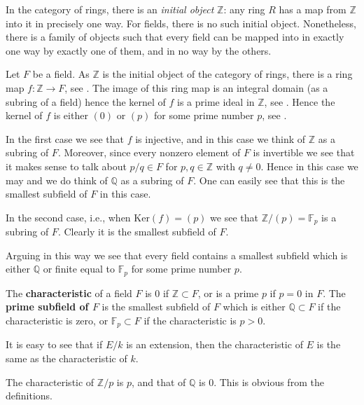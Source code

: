 In the category of rings, there is an \emph{initial object} $\mathbb{Z}$: any
ring $R$ has a map from $\mathbb{Z}$ into it in precisely one way. For fields,
there is no such initial object.
Nonetheless, there is a family of objects such that every field can be mapped
into in exactly one way by exactly one of them, and in no way by the others.

Let $F$ be a field. As $\mathbb{Z}$ is the initial object of the category of
rings, there is a ring map $f : \mathbb{Z} \to F$, see
.
The image of this ring map is an integral domain (as a subring of a field)
hence the kernel of $f$ is a prime ideal in $\mathbb{Z}$, see
.
Hence the kernel of $f$ is either $(0)$ or $(p)$ for some prime number $p$, see
.

In the first case we see that $f$ is injective, and in this case
we think of $\mathbb{Z}$ as a subring of $F$. Moreover, since every
nonzero element of $F$ is invertible we see that it makes sense to
talk about $p/q \in F$ for $p, q \in \mathbb{Z}$ with $q \not = 0$.
Hence in this case we may and we do think of $\mathbb{Q}$ as a subring of $F$.
One can easily see that this is the smallest subfield of $F$ in this case.

In the second case, i.e., when $\text{Ker}(f) = (p)$ we see that
$\mathbb{Z}/(p) = \mathbb{F}_p$ is a subring of $F$.  Clearly it is the smallest subfield of $F$.

Arguing in this way we see that every field contains a smallest subfield
which is either $\mathbb{Q}$ or finite equal to $\mathbb{F}_p$ for some
prime number $p$.

\begin{definition}
The \textbf{characteristic} of a field $F$ is $0$ if
$\mathbb{Z} \subset F$, or is a prime $p$ if $p = 0$ in $F$.
The \textbf{prime subfield of $F$} is the smallest subfield of $F$
which is either $\mathbb{Q} \subset F$ if the characteristic is zero, or
$\mathbb{F}_p \subset F$ if the characteristic is $p > 0$.
\end{definition}


It is easy to see that if $E/k$ is an extension, then the characteristic of
$E$ is the same as the characteristic of $k$. 

\begin{example} 
The characteristic of $\mathbb{Z}/p$ is $p$, and that of $\mathbb{Q}$ is $0$.
This is obvious from the definitions.
\end{example} 

